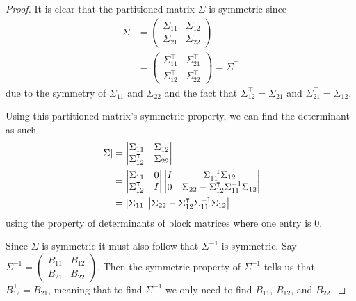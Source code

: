 \documentclass[12pt]{article}
\theoremstyle{definition}
\begin{document}
\begin{proof}
   It is clear that the partitioned matrix $\Sigma$ is symmetric since
   \begin{align*}
     \Sigma
     &= \begin{pmatrix} \Sigma_{11} & \Sigma_{12} \\ \Sigma_{21} & \Sigma_{22} \end{pmatrix} \\
     &= \begin{pmatrix} \Sigma_{11}^\intercal & \Sigma_{21}^\intercal \\ \Sigma_{12}^\intercal & \Sigma_{22}^\intercal \end{pmatrix} = \Sigma ^\intercal
   \end{align*}
   due to the symmetry of $\Sigma_{11}$ and $\Sigma_{22}$ and the fact that $\Sigma_{12} ^ \intercal = \Sigma_{21}$
   and $\Sigma_{21} ^ \intercal = \Sigma_{12}$.

   Using this partitioned matrix's symmetric property, we can find the determinant
   as such
   \begin{align}\label{determinant}
     \left| \Sigma \right|
     &= \left| \begin{matrix} \Sigma_{11} & \Sigma_{12} \\ \Sigma_{12}^\intercal & \Sigma_{22} \end{matrix} \right| \notag \\
     &= \left| \begin{matrix} \Sigma_{11} & 0 \\ \Sigma_{12}^\intercal & I \end{matrix} \right| \left| \begin{matrix} I & \Sigma_{11}^{-1}\Sigma_{12} \\ 0  & \Sigma_{22} - \Sigma_{12}^\intercal\Sigma_{11}^{-1}\Sigma_{12} \end{matrix} \right| \notag \\
     &= \left| \Sigma_{11} \right| \left| \Sigma_{22} - \Sigma_{12}^\intercal \Sigma_{11}^{-1} \Sigma_{12}\right|
   \end{align}
   using the property of determinants of block matrices where one entry is $0$.

   Since $\Sigma$ is symmetric it must also follow that $\Sigma^{-1}$ is
   symmetric. Say $\Sigma^{-1} = \begin{pmatrix} B_{11} & B_{12} \\ B_{21} & B_{22}\end{pmatrix}$.
   Then the symmetric property of $\Sigma^{-1}$ tells us that $B_{12} ^\intercal = B_{21}$,
   meaning that to find $\Sigma^{-1}$ we only need to find $B_{11}$, $B_{12}$, and $B_{22}$.


\end{proof}
\end{document}
